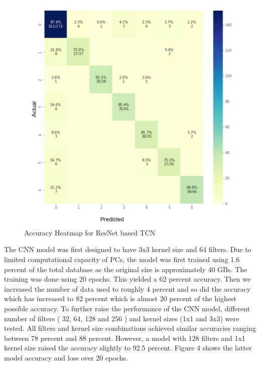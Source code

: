 \documentclass[conference]{IEEEtran}
\begin{document}
\begin{figure}
    \centering
    \includegraphics[scale = 0.7]{ResNetHeatmap.png}
    \caption{ Accuracy Heatmap for ResNet based TCN}
\end{figure}




The CNN model was first designed to have 3x3 kernel size and 64 filters. Due to limited computational capacity of PCs, the model was first trained using 1.6 percent of the total database as the original size is approximately 40 GBs.
The training was done using 20 epochs. This yielded a 62 percent accuracy. Then we increased the number of data used to roughly 4 percent and so did the accuracy which has increased to 82 percent which is almost 20 percent of the highest possible accuracy. To further raise the performance of the CNN model, different number of filters ( 32, 64, 128 and 256 ) and kernel sizes (1x1 and 3x3) were tested. All filters and kernel size combinations achieved similar accuracies ranging between 78 percent and 88 percent. However, a model with 128 filters and 1x1 kernel size raised the accuracy slightly to 92.5 percent. Figure 4 shows the latter model accuracy and loss over 20 epochs.
\end{document}
